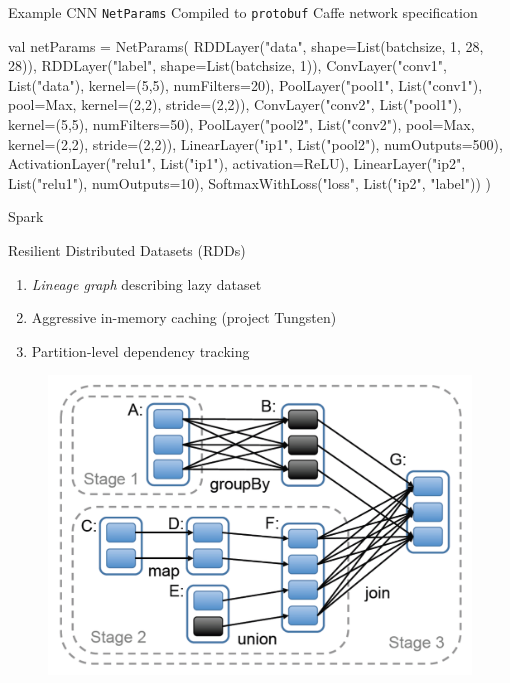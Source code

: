 \documentclass[pdf]{beamer}
\begin{document}
\begin{frame}[fragile]{Example CNN \texttt{NetParams}}
    Compiled to \texttt{protobuf} Caffe network specification
    \begin{scalacode}
val netParams = NetParams(
    RDDLayer("data", shape=List(batchsize, 1, 28, 28)),
    RDDLayer("label", shape=List(batchsize, 1)),
    ConvLayer("conv1", List("data"), kernel=(5,5), numFilters=20),
    PoolLayer("pool1", List("conv1"), pool=Max, kernel=(2,2), stride=(2,2)),
    ConvLayer("conv2", List("pool1"), kernel=(5,5), numFilters=50),
    PoolLayer("pool2", List("conv2"), pool=Max, kernel=(2,2), stride=(2,2)),
    LinearLayer("ip1", List("pool2"), numOutputs=500),
    ActivationLayer("relu1", List("ip1"), activation=ReLU),
    LinearLayer("ip2", List("relu1"), numOutputs=10),
    SoftmaxWithLoss("loss", List("ip2", "label"))
)
    \end{scalacode}
\end{frame}

\begin{frame}{Spark \cite{zaharia2012resilient}}
    \begin{block}{Resilient Distributed Datasets (RDDs)}
        \begin{enumerate}
            \item \emph{Lineage graph} describing lazy dataset
            \item Aggressive in-memory caching (project Tungsten)
            \item Partition-level dependency tracking
        \end{enumerate}
    \end{block}
    \begin{figure}[htpb]
        \centering
        \includegraphics[width=0.5\linewidth]{Figures/partition-tracking.png}
    \end{figure}
\end{frame}
\end{document}
